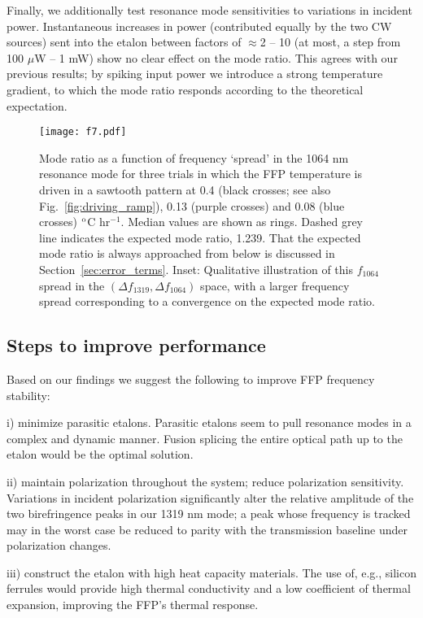 \documentclass[10pt]{article}
\newcommand{\dC}{$^{\rm o}$C}
\begin{document}
Finally, we additionally test resonance mode sensitivities to variations in incident power. Instantaneous increases in power (contributed equally by the two CW sources) sent into the etalon between factors of $\approx$2 -- 10 (at most, a step from 100 $\mu$W -- 1 mW) show no clear effect on the mode ratio. This agrees with our previous results; by spiking input power we introduce a strong temperature gradient, to which the mode ratio responds according to the theoretical expectation.

\begin{figure}
\texttt{[image: f7.pdf]}
\caption{Mode ratio as a function of frequency \lq{}spread\rq{} in the 1064 nm resonance mode for three trials in which the FFP temperature is driven in a sawtooth pattern at 0.4 (black crosses; see also Fig.~\ref{fig:driving_ramp}), 0.13 (purple crosses) and 0.08 (blue crosses) {\dC} hr$^{-1}$. Median values are shown as rings. Dashed grey line indicates the expected mode ratio, 1.239. That the expected mode ratio is always approached from below is discussed in Section~\ref{sec:error_terms}. Inset: Qualitative illustration of this $f_{1064}$ spread in the $(\Delta f_{1319},\Delta f_{1064})$ space, with a larger frequency spread corresponding to a convergence on the expected mode ratio.}
\label{fig:mode_ratio_df} 
\end{figure}

\subsection{Steps to improve performance}
\label{sec:error_sources}
Based on our findings we suggest the following to improve FFP frequency stability:

i) minimize parasitic etalons. Parasitic etalons seem to pull resonance modes in a complex and dynamic manner. Fusion splicing the entire optical path up to the etalon would be the optimal solution.

ii) maintain polarization throughout the system; reduce polarization sensitivity. Variations in incident polarization significantly alter the relative amplitude of the two birefringence peaks in our 1319 nm mode; a peak whose frequency is tracked may in the worst case be reduced to parity with the transmission baseline under polarization changes.

iii) construct the etalon with high heat capacity materials. The use of, e.g., silicon ferrules would provide high thermal conductivity and a low coefficient of thermal expansion, improving the FFP's thermal response.
\end{document}
